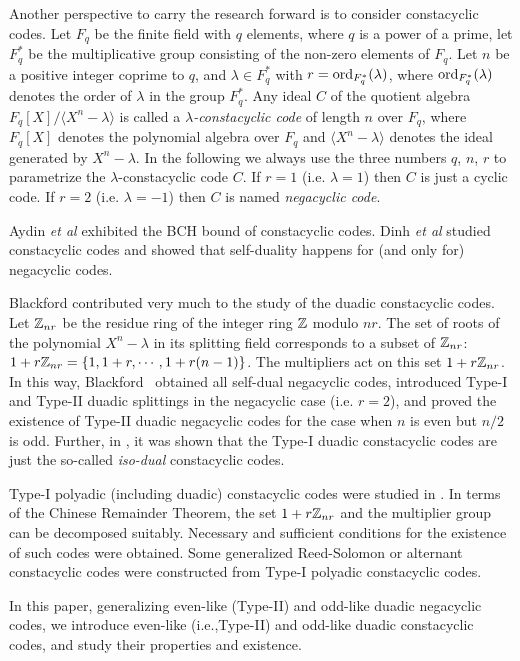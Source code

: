 \documentclass{article}
\numberwithin{equation}{section}
\numberwithin{table}{section}
\def\Z{{\Bbb Z}}
\begin{document}
Another perspective to carry the research forward is to consider constacyclic codes.
Let $F_q$ be the finite field with $q$ elements, where $q$ is a power of a prime,
let $F_q^*$ be the multiplicative group consisting of the non-zero elements of $F_q$.
Let $n$ be a positive integer coprime to $q$,
and $\lambda\in F_q^*$ with $r={\rm ord}_{F_q^*}(\lambda)$, where
${\rm ord}_{F_q^*}(\lambda)$ denotes the order of $\lambda$
in the group $F_q^*$.
Any ideal $C$ of the quotient algebra $F_q[X]/\langle X^n-\lambda\rangle$
is called a {\em $\lambda$-constacyclic code} of length $n$ over $F_q$,
where $F_q[X]$ denotes the polynomial algebra over $F_q$ and
$\langle X^n-\lambda\rangle$ denotes the ideal generated by $X^n-\lambda$.
In the following we always use the three numbers $q$, $n$, $r$
to parametrize the $\lambda$-constacyclic code $C$.
If $r=1$ (i.e. $\lambda=1$) then $C$ is just a cyclic code.
If $r=2$ (i.e. $\lambda=-1$) then $C$ is named {\em negacyclic code}.

Aydin {\it et al} \cite{ASR} exhibited the BCH bound of constacyclic codes.
Dinh {\it et al} \cite{DL,D} studied
constacyclic codes and showed that self-duality happens for
 (and only for) negacyclic codes.

Blackford \cite{Bl08, Bl13} contributed very much to
the study of the duadic constacyclic codes.
Let $\Z_{nr}$ be the residue ring of the integer ring $\Z$ modulo $nr$.
The set of roots of the polynomial $X^n-\lambda$ in its splitting field
corresponds to a subset  of $\Z_{nr}$:
$1+r\Z_{nr}=\{1,1+r,\cdots,1+r(n-1)\}$.
The multipliers act on this set $1+r\Z_{nr}$.
In this way, Blackford~\cite{Bl08} obtained all self-dual negacyclic codes,
introduced Type-I and Type-II %
duadic splittings in the negacyclic case (i.e. $r=2$),
and proved the existence of Type-II duadic negacyclic codes
for the case when $n$ is even but $n/2$ is odd.
Further, in \cite{Bl13},
it was shown that the Type-I duadic constacyclic codes
are just the so-called {\em iso-dual} constacyclic codes.

Type-I polyadic (including duadic) constacyclic codes
were studied in \cite{CDFL}. In terms of the Chinese Remainder Theorem, the set
$1+r\Z_{nr}$ and the multiplier group can be decomposed suitably.
Necessary and sufficient conditions for the existence of such codes
were obtained. Some generalized Reed-Solomon or alternant constacyclic codes
were constructed from Type-I polyadic constacyclic codes.

In this paper, generalizing even-like (Type-II) and odd-like duadic negacyclic codes,
we introduce even-like (i.e.,Type-II) and odd-like duadic constacyclic codes,
and study their properties and existence.
\end{document}

